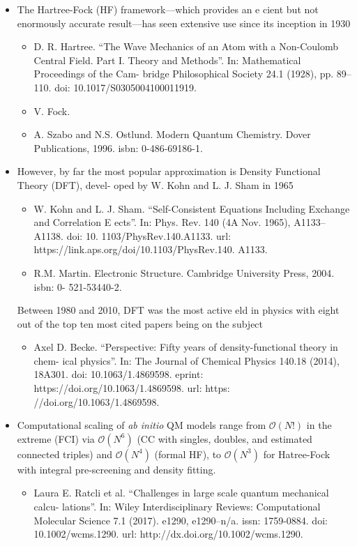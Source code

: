 \documentclass[twoside,english]{uiofysmaster}
\begin{document}
\begin{itemize}
\begin{itemize}
	\end{itemize}
	\item The Hartree-Fock (HF) framework—which provides an e cient but not enormously accurate result—has seen extensive use since its inception in 1930
	\begin{itemize}
		\item D. R. Hartree. “The Wave Mechanics of an Atom with a Non-Coulomb Central Field. Part I. Theory and Methods”. In: Mathematical Proceedings of the Cam- bridge Philosophical Society 24.1 (1928), pp. 89–110. doi: 10.1017/S0305004100011919.
		\item V. Fock. %
		\item A. Szabo and N.S. Ostlund. Modern Quantum Chemistry. Dover Publications, 1996. isbn: 0-486-69186-1.
	\end{itemize}
	\item However, by far the most popular approximation is Density Functional Theory (DFT), devel- oped by W. Kohn and L. J. Sham in 1965
	\begin{itemize}
		\item W. Kohn and L. J. Sham. “Self-Consistent Equations Including Exchange and Correlation E ects”. In: Phys. Rev. 140 (4A Nov. 1965), A1133–A1138. doi: 10. 1103/PhysRev.140.A1133. url: https://link.aps.org/doi/10.1103/PhysRev.140. A1133.
		\item R.M. Martin. Electronic Structure. Cambridge University Press, 2004. isbn: 0- 521-53440-2.
	\end{itemize}
	Between 1980 and 2010, DFT was the most active  eld in physics with eight out of the top ten most cited papers being on the subject 
	\begin{itemize}
		\item Axel D. Becke. “Perspective: Fifty years of density-functional theory in chem- ical physics”. In: The Journal of Chemical Physics 140.18 (2014), 18A301. doi: 10.1063/1.4869598. eprint: https://doi.org/10.1063/1.4869598. url: https: //doi.org/10.1063/1.4869598.
	\end{itemize}
	\item Computational scaling of \textit{ab initio} QM models range from $\mathcal{O}(N!)$ in the extreme (FCI) via $\mathcal{O}(N^6)$ (CC with singles, doubles, and estimated connected triples) and $\mathcal{O}(N^4)$ (formal HF), to $\mathcal{O}(N^3)$ for Hatree-Fock with integral pre-screening and density fitting.
	\begin{itemize}
		\item Laura E. Ratcli  et al. “Challenges in large scale quantum mechanical calcu- lations”. In: Wiley Interdisciplinary Reviews: Computational Molecular Science 7.1 (2017). e1290, e1290–n/a. issn: 1759-0884. doi: 10.1002/wcms.1290. url: http://dx.doi.org/10.1002/wcms.1290.
	\end{itemize}
\end{itemize}
\end{document}
